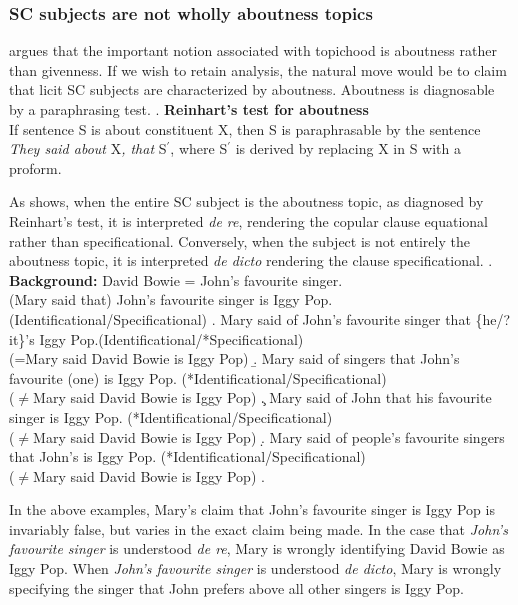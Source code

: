 \documentclass[GPFinal]{subfiles}
\begin{document}
\subsubsection{SC subjects are not wholly aboutness topics}
\textcite{reinhart1981pragmatics} argues that the important notion associated with topichood is aboutness rather than givenness.
If we wish to retain  analysis, the natural move would be to claim that licit SC subjects are characterized by aboutness.
Aboutness is diagnosable by a paraphrasing test.
\ex. \textbf{Reinhart's test for aboutness}\\
If sentence S is about constituent X, then S is paraphrasable by the sentence \textit{They said about }X\textit{, that }S$^\prime$, where S$^\prime$ is derived by replacing X in S with a proform.

As \Next shows, when the entire SC subject is the aboutness topic, as diagnosed by Reinhart's test, it is interpreted \textit{de re}, rendering the copular clause equational rather than specificational.
Conversely, when the subject is not entirely the aboutness topic, it is interpreted \textit{de dicto} rendering the clause specificational.
\ex. \textbf{Background:} David Bowie = John's favourite singer.\\
(Mary said that) John's favourite singer is Iggy Pop. (Identificational/Specificational)
\a. Mary said of John's favourite singer that \{he/?it\}'s Iggy Pop.(Identificational/*Specificational)\\
(=Mary said David Bowie is Iggy Pop)
\b. Mary said of singers that John's favourite (one) is Iggy Pop. (*Identificational/Specificational)\\
($\neq$Mary said David Bowie is Iggy Pop)
\c. Mary said of John that his favourite singer is Iggy Pop. (*Identificational/Specificational)\\
($\neq$Mary said David Bowie is Iggy Pop)
\d. Mary said of people's favourite singers that John's is Iggy Pop. (*Identificational/Specificational)\\
($\neq$Mary said David Bowie is Iggy Pop)
\z.

In the above examples, Mary's claim that John's favourite singer is Iggy Pop is invariably false, but varies in the exact claim being made.
In the case that \textit{John's favourite singer} is understood \textit{de re}, Mary is wrongly identifying David Bowie as Iggy Pop.
When \textit{John's favourite singer} is understood \textit{de dicto}, Mary is wrongly specifying the singer that John prefers above all other singers is Iggy Pop.
\end{document}
